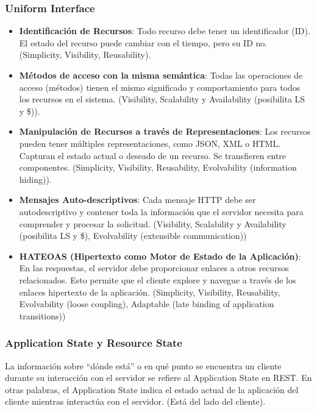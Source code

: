 \documentclass{article}
\begin{document}
		\subsubsection{Uniform Interface}
		\begin{itemize}		
			\item \textbf{Identificación de Recursos}: Todo recurso debe tener un identificador (ID). El estado del recurso puede cambiar con el tiempo, pero su ID no. (Simplicity, Visibility, Reusability).
			
			\item \textbf{Métodos de acceso con la misma semántica}: Todas las operaciones de acceso (métodos) tienen el mismo significado y comportamiento para todos los recursos en el sistema. (Visibility, Scalability y Availability (posibilita LS y \$)).
			
			\item \textbf{Manipulación de Recursos a través de Representaciones}: Los recursos pueden tener múltiples representaciones, como JSON, XML o HTML. Capturan el estado actual o deseado de un recurso. Se transfieren entre componentes. (Simplicity, Visibility, Reusability,
			Evolvability (information hiding)).
			
			\item \textbf{Mensajes Auto-descriptivos}: Cada mensaje HTTP debe ser autodescriptivo y contener toda la información que el servidor necesita para comprender y procesar la solicitud. (Visibility, Scalability y Availability (posibilita LS y \$), Evolvability (extensible communication))
			
			\item \textbf{HATEOAS (Hipertexto como Motor de Estado de la Aplicación)}: En las respuestas, el servidor debe proporcionar enlaces a otros recursos relacionados. Esto permite que el cliente explore y navegue a través de los enlaces hipertexto de la aplicación. (Simplicity, Visibility, Reusability, Evolvability (loose coupling), Adaptable (late binding of application transitions))
		\end{itemize}
		
		
		\subsubsection{Application State y Resource State}
		La información sobre ``dónde está'' o en qué punto se encuentra un cliente durante su interacción con el servidor se refiere al Application State en REST. En otras palabras, el Application State indica el estado actual de la aplicación del cliente mientras interactúa con el servidor. (Está del lado del cliente).
		
\end{document}
